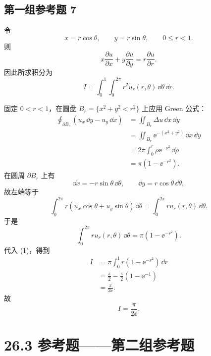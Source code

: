 \subsection*{第一组参考题 7}
\begin{xsolution}
令
\[
  x=r\cos\theta,
  \qquad
  y=r\sin\theta,
  \qquad
  0\le r<1.
\]
则
\[
  x\frac{\partial u}{\partial x}
  +y\frac{\partial u}{\partial y}
  =r\frac{\partial u}{\partial r}.
\]
因此所求积分为
\begin{equation}
  I=\int_0^1\int_0^{2\pi}r^2u_r(r,\theta)\,\dd\theta\,\dd r.
  \tag{1}
\end{equation}

固定 $0<r<1$，在圆盘 $B_r=\{x^2+y^2<r^2\}$ 上应用 Green 公式：
\begin{align*}
  \oint_{\partial B_r}
  \left(u_x\,\dd y-u_y\,\dd x\right)
  &=\iint_{B_r}\Delta u\,\dd x\,\dd y\\
  &=\iint_{B_r}\ee^{-(x^2+y^2)}\,\dd x\,\dd y\\
  &=2\pi\int_0^r\rho\ee^{-\rho^2}\,\dd\rho\\
  &=\pi(1-\ee^{-r^2}).
\end{align*}
在圆周 $\partial B_r$ 上有
\[
  \dd x=-r\sin\theta\,\dd\theta,
  \qquad
  \dd y=r\cos\theta\,\dd\theta,
\]
故左端等于
\[
  \int_0^{2\pi}r
  \left(u_x\cos\theta+u_y\sin\theta\right)\,\dd\theta
  =\int_0^{2\pi}r u_r(r,\theta)\,\dd\theta.
\]
于是
\[
  \int_0^{2\pi}r u_r(r,\theta)\,\dd\theta
  =\pi(1-\ee^{-r^2}).
\]
代入 (1)，得到
\begin{align*}
  I
  &=\pi\int_0^1 r(1-\ee^{-r^2})\,\dd r\\
  &=\frac{\pi}{2}-\frac{\pi}{2}(1-\ee^{-1})\\
  &=\frac{\pi}{2\ee}.
\end{align*}
故
\[
  \boxed{I=\frac{\pi}{2\ee}}.
\]
\end{xsolution}

\section*{26.3 参考题——第二组参考题}

